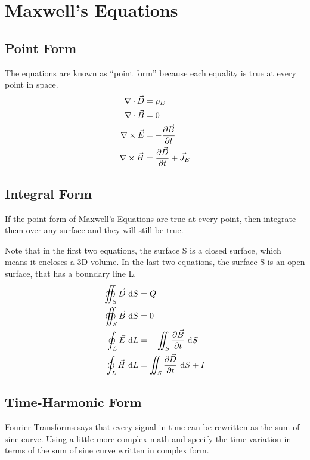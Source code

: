 \documentclass{article}
\begin{document}
	\section{Maxwell's Equations}
	
	\subsection{Point Form}
	The equations are known as ``point form'' because each equality is true at every point in space.
	\begin{align*}
		\opDivergence \ElectricFluxDensity & = \ElectricChargeDensity
		\\
		\opDivergence \MagneticFluxDensity & = 0
		\\
		\opCurl \ElectricField & = - \frac{\partial \MagneticFluxDensity}{\partial \Time}
		\\
		\opCurl \MagneticField & = \frac{\partial \ElectricFluxDensity}{\partial \Time} + \ElectricCurrentDensity
	\end{align*}
	
	\subsection{Integral Form}
	If the point form of Maxwell's Equations are true at every point, then integrate them over any surface and they will still be true.
	
	Note that in the first two equations, the surface S is a closed surface, which means it encloses a 3D volume. In the last two equations, the surface S is an open surface, that has a boundary line L.
	\begin{align*}
		\oiint_\Surface \ElectricFluxDensity \d[\Surface] & = \ElectricCharge
		\\
		\oiint_\Surface \MagneticFluxDensity \d[\Surface] & = 0
		\\
		\oint_\Line \ElectricField \d[\Line] & = - \iint_\Surface \frac{\partial \MagneticFluxDensity}{\partial \Time} \d[\Surface]
		\\
		\oint_\Line \MagneticField \d[\Line] & = \iint_\Surface \frac{\partial \ElectricFluxDensity}{\partial \Time} \d[\Surface] + \ElectricCurrent
	\end{align*}
	
	\subsection{Time-Harmonic Form}
	Fourier Transforms says that every signal in time can be rewritten as the sum of sine curve. Using a little more complex math and specify the time variation in terms of the sum of sine curve written in complex form.
	
\end{document}
